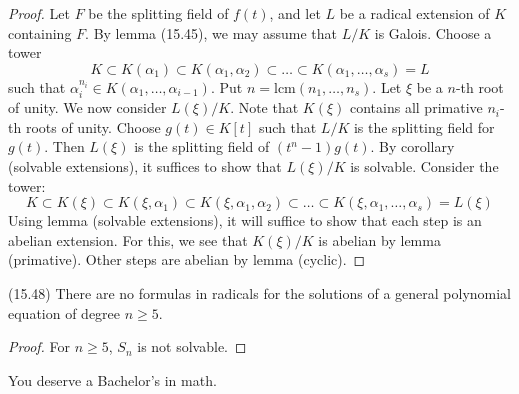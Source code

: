 \vspace{2ex}
\begin{proof}
Let $F$ be the splitting field of $f(t)$, and let $L$ be a radical extension of $K$ containing $F$. By lemma (15.45), we may assume that $L/K$ is Galois. Choose a tower
\[K\subset K(\alpha_1)\subset K(\alpha_1,\alpha _{2})\subset \ldots \subset K(\alpha_1,\ldots ,\alpha _{s})=L\]
such that $\alpha _{i}^{n_{i}}\in K(\alpha_1,\ldots ,\alpha _{i-1})$. Put $n=\mathrm{lcm}(n_1,\ldots,n_{s} )$. Let $\xi $ be a $n$-th root of unity. We now consider $L(\xi )/K$. Note that $K(\xi )$ contains all primative $n_{i}$-th roots of unity. Choose $g(t)\in K[t]$ such that $L/K$ is the splitting field for $g(t)$. Then $L(\xi )$	is the splitting field of $(t^{n}-1)g(t)$. By corollary (solvable extensions), it suffices to show that $L(\xi )/K$ is solvable. Consider the tower:
\[K\subset K(\xi )\subset K(\xi ,\alpha_1)\subset K(\xi ,\alpha_1,\alpha_2)\subset \ldots \subset K(\xi ,\alpha_1,\ldots ,\alpha _{s})=L(\xi )\]
Using lemma (solvable extensions), it will suffice to show that each step is an abelian extension. For this, we see that $K(\xi )/K$ is abelian by lemma (primative). Other steps are abelian by lemma (cyclic). 
\end{proof}
\vspace{2ex}
\begin{cor}
(15.48) There are no formulas in radicals for the solutions of a general polynomial equation of degree $n\geq 5$. 
\end{cor}
\vspace{2ex}
\begin{proof}
For $n\geq 5$, $S_{n}$ is not solvable.
\end{proof}
\vspace{2ex}
\begin{rmk}
You deserve a Bachelor's in math.
\end{rmk}
\vspace{2ex}

